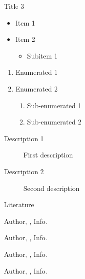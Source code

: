 \documentclass[beamer,aspectratio=169,compress,t]{beamer}
\begin{document}
\begin{frame}{Title 3}

  \begin{itemize}
  \item Item 1
  \item Item 2
    \begin{itemize}
    \item Subitem 1
    \end{itemize}
  \end{itemize}

  \begin{enumerate}
  \item Enumerated 1
  \item Enumerated 2
    \begin{enumerate}
    \item Sub-enumerated 1
    \item Sub-enumerated 2
    \end{enumerate}
  \end{enumerate}

  \begin{description}
  \item[Description 1] First description
  \item[Description 2] Second description
  \end{description}
  
\end{frame}


\begin{frame}{Literature}
  \small
  \begin{thebibliography}{9}

  \beamertemplatebookbibitems

    Author,
    ,
    \newblock Info.

  \beamertemplatearticlebibitems

    Author,
    ,
    \newblock Info.

    Author,
    ,
    \newblock Info.

    Author,
    ,
    \newblock Info.

  \end{thebibliography}
\end{frame}
\end{document}

